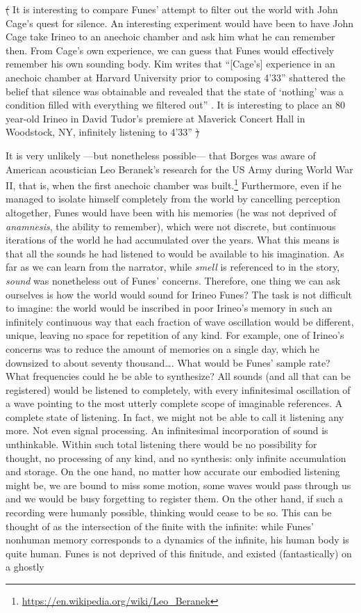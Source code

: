 \sout{(} It is interesting to compare Funes' attempt to filter out the world with John Cage's quest for silence. An interesting experiment would have been to have John Cage take Irineo to an anechoic chamber and ask him what he can remember then. From Cage's own experience, we can guess that Funes would effectively remember his own sounding body. Kim \textcite{Cas00:The} writes that ``[Cage's] experience in an anechoic chamber at Harvard University prior to composing 4'33'' shattered the belief that silence was obtainable and revealed that the state of `nothing' was a condition filled with everything we filtered out'' \parencite[14]{Cas00:The}. It is interesting to place an 80 year-old Irineo in David Tudor's premiere at Maverick Concert Hall in Woodstock, NY, infinitely listening to 4'33'' \sout{)}

It is very unlikely ---but nonetheless possible--- that Borges was aware of American acoustician Leo Beranek's research for the US Army during World War II, that is, when the first anechoic chamber was built.\footnote{\url{https://en.wikipedia.org/wiki/Leo_Beranek}} Furthermore, even if he managed to isolate himself completely from the world by cancelling perception altogether, Funes would have been with his memories (he was not deprived of \textit{anamnesis}, the ability to remember), which were not discrete, but continuous iterations of the world he had accumulated over the years. What this means is that all the sounds he had listened to would be available to his imagination. As far as we can learn from the narrator, while \textit{smell} is referenced to in the story, \textit{sound} was nonetheless out of Funes' concerns. Therefore, one thing we can ask ourselves is how the world would sound for Irineo Funes? The task is not difficult to imagine: the world would be inscribed in poor Irineo's memory in such an infinitely continuous way that each fraction of wave oscillation would be different, unique, leaving no space for repetition of any kind. For example, one of Irineo's concerns was to reduce the amount of memories on a single day, which he downsized to about seventy thousand\dots. What would be Funes' sample rate? What frequencies could he be able to synthesize? All sounds (and all that can be registered) would be listened to completely, with every infinitesimal oscillation of a wave pointing to the most utterly complete scope of imaginable references. A complete state of listening. In fact, we might not be able to call it listening any more. Not even signal processing. An infinitesimal incorporation of sound is unthinkable. Within such total listening there would be no possibility for thought, no processing of any kind, and no synthesis: only infinite accumulation and storage. On the one hand, no matter how accurate our embodied listening might be, we are bound to miss some motion, some waves would pass through us and we would be busy forgetting to register them. On the other hand, if such a recording were humanly possible, thinking would cease to be so. This can be thought of as the intersection of the finite with the infinite: while Funes' nonhuman memory corresponds to a dynamics of the infinite, his human body is quite human. Funes is not deprived of this finitude, and existed (fantastically) on a ghostly 
